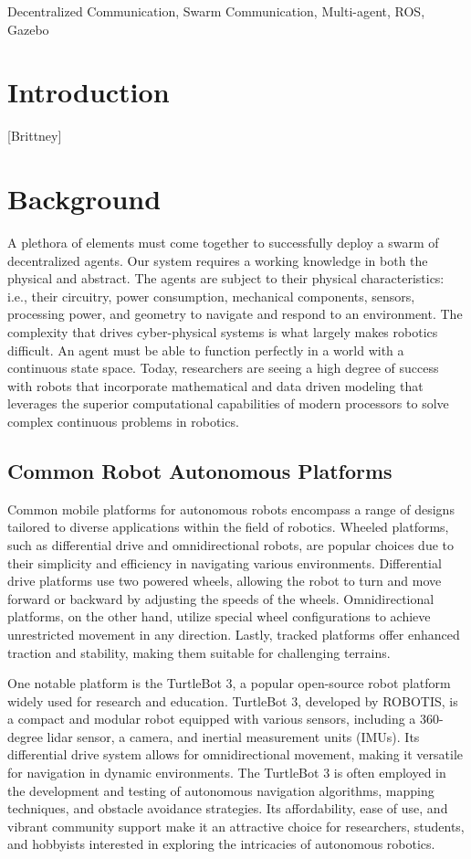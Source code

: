 \documentclass[conference]{IEEEtran}
\begin{document}
\begin{IEEEkeywords}
Decentralized Communication, Swarm Communication, Multi-agent, ROS, Gazebo
\end{IEEEkeywords}

\section{Introduction}
[Brittney]

\section{Background} 
A plethora of elements must come together to successfully deploy a swarm of decentralized agents. Our system requires a working knowledge in both the physical and abstract. The agents are subject to their physical characteristics: i.e., their circuitry, power consumption, mechanical components, sensors, processing power, and geometry to navigate and respond to an environment. The complexity that drives cyber-physical systems is what largely makes robotics difficult. An agent must be able to function perfectly in a world with a continuous state space. Today, researchers are seeing a high degree of success with robots that incorporate mathematical and data driven modeling that leverages the superior computational capabilities of modern processors to solve complex continuous problems in robotics. 
\subsection{Common Robot Autonomous Platforms} Common mobile platforms for autonomous robots encompass a range of designs tailored to diverse applications within the field of robotics. Wheeled platforms, such as differential drive and omnidirectional robots, are popular choices due to their simplicity and efficiency in navigating various environments. Differential drive platforms use two powered wheels, allowing the robot to turn and move forward or backward by adjusting the speeds of the wheels. Omnidirectional platforms, on the other hand, utilize special wheel configurations to achieve unrestricted movement in any direction. Lastly, tracked platforms offer enhanced traction and stability, making them suitable for challenging terrains.

One notable platform is the TurtleBot 3, a popular open-source robot platform widely used for research and education. TurtleBot 3, developed by ROBOTIS, is a compact and modular robot equipped with various sensors, including a 360-degree lidar sensor, a camera, and inertial measurement units (IMUs). Its differential drive system allows for omnidirectional movement, making it versatile for navigation in dynamic environments. The TurtleBot 3 is often employed in the development and testing of autonomous navigation algorithms, mapping techniques, and obstacle avoidance strategies. Its affordability, ease of use, and vibrant community support make it an attractive choice for researchers, students, and hobbyists interested in exploring the intricacies of autonomous robotics.
\end{document}
